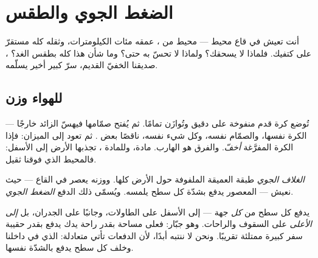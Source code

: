 \chapter{الضغط الجوي والطقس}\label{ch:g5:air-pressure-weather}

أنت تعيش في قاع محيط --- محيط من ، عمقه مئات الكيلومترات،
وثقله كله مستقرّ على كتفيك. فلماذا لا يسحقك؟ ولماذا لا تحسّ به
حتى؟ وما شأن هذا كله بطقس الغد؟ ، صديقنا الخفيّ القديم،
سرّ كبير أخير يسلّمه.

\section{للهواء وزن}

\begin{example}[وزن ما لا يُرى]\label{ex:g5:air-pressure-weather:weighing}
تُوضع كرة قدم منفوخة على  دقيق وتُوازَن تمامًا. ثم
يُفتح صمّامها فيهسّ  الزائد خارجًا --- الكرة نفسها،
والصمّام نفسه، وكل شيء نفسه، ناقصًا بعض . ثم تعود إلى
الميزان: فإذا الكرة المفرَّغة \emph{أخفّ}. والفرق هو  
الهارب.  مادة، وللمادة ،  تجذبها الأرض إلى
الأسفل: فالمحيط الذي فوقنا ثقيل.
\end{example}

\begin{definition}\label{def:g5:air-pressure-weather:pressure}
\emph{الغلاف الجوي} طبقة  العميقة الملفوفة
حول الأرض كلها. ووزنه يعصر  في القاع --- حيث نعيش ---
 المعصور يدفع بشدّة كل سطح يلمسه. ويُسمّى ذلك الدفع
\emph{الضغط الجوي}.
\end{definition}

\begin{proposition}\label{prop:g5:air-pressure-weather:allsides}
يدفع  كل سطح من \emph{كل} جهة --- إلى الأسفل على
الطاولات، وجانبًا على الجدران، بل \emph{إلى الأعلى} على السقوف
والراحات. وهو جبّار: فعلى مساحة بقدر راحة يدك يدفع  بقدر
 حقيبة سفر كبيرة ممتلئة تقريبًا. ونحن لا ننتبه أبدًا، لأن
الدفعات تأتي متعادلة:  الذي في داخلنا وخلف كل سطح يدفع
بالشدّة نفسها.
\end{proposition}

